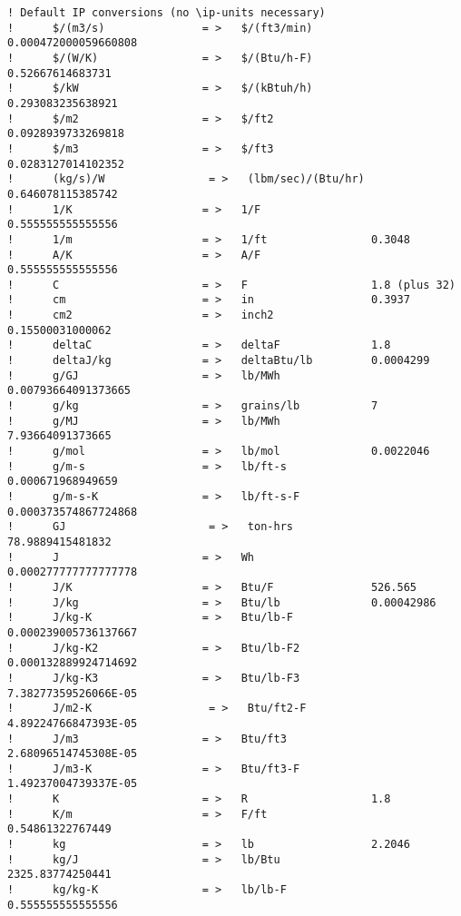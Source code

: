 \begin{lstlisting}
! Default IP conversions (no \ip-units necessary)
!      $/(m3/s)               = >   $/(ft3/min)         0.000472000059660808
!      $/(W/K)                = >   $/(Btu/h-F)         0.52667614683731
!      $/kW                   = >   $/(kBtuh/h)         0.293083235638921
!      $/m2                   = >   $/ft2               0.0928939733269818
!      $/m3                   = >   $/ft3               0.0283127014102352
!      (kg/s)/W                = >   (lbm/sec)/(Btu/hr)  0.646078115385742
!      1/K                    = >   1/F                 0.555555555555556
!      1/m                    = >   1/ft                0.3048
!      A/K                    = >   A/F                 0.555555555555556
!      C                      = >   F                   1.8 (plus 32)
!      cm                     = >   in                  0.3937
!      cm2                    = >   inch2               0.15500031000062
!      deltaC                 = >   deltaF              1.8
!      deltaJ/kg              = >   deltaBtu/lb         0.0004299
!      g/GJ                   = >   lb/MWh              0.00793664091373665
!      g/kg                   = >   grains/lb           7
!      g/MJ                   = >   lb/MWh              7.93664091373665
!      g/mol                  = >   lb/mol              0.0022046
!      g/m-s                  = >   lb/ft-s             0.000671968949659
!      g/m-s-K                = >   lb/ft-s-F           0.000373574867724868
!      GJ                      = >   ton-hrs             78.9889415481832
!      J                      = >   Wh                  0.000277777777777778
!      J/K                    = >   Btu/F               526.565
!      J/kg                   = >   Btu/lb              0.00042986
!      J/kg-K                 = >   Btu/lb-F            0.000239005736137667
!      J/kg-K2                = >   Btu/lb-F2           0.000132889924714692
!      J/kg-K3                = >   Btu/lb-F3           7.38277359526066E-05
!      J/m2-K                  = >   Btu/ft2-F           4.89224766847393E-05
!      J/m3                   = >   Btu/ft3             2.68096514745308E-05
!      J/m3-K                 = >   Btu/ft3-F           1.49237004739337E-05
!      K                      = >   R                   1.8
!      K/m                    = >   F/ft                0.54861322767449
!      kg                     = >   lb                  2.2046
!      kg/J                   = >   lb/Btu              2325.83774250441
!      kg/kg-K                = >   lb/lb-F             0.555555555555556

\end{lstlisting}
